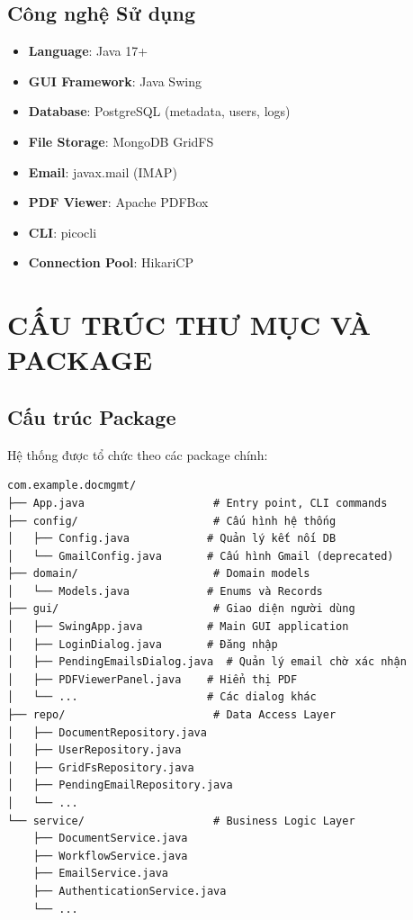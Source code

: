 \documentclass[12pt,a4paper]{article}
\begin{document}
\subsection{Công nghệ Sử dụng}
\begin{itemize}
    \item \textbf{Language}: Java 17+
    \item \textbf{GUI Framework}: Java Swing
    \item \textbf{Database}: PostgreSQL (metadata, users, logs)
    \item \textbf{File Storage}: MongoDB GridFS
    \item \textbf{Email}: javax.mail (IMAP)
    \item \textbf{PDF Viewer}: Apache PDFBox
    \item \textbf{CLI}: picocli
    \item \textbf{Connection Pool}: HikariCP
\end{itemize}

\section{CẤU TRÚC THƯ MỤC VÀ PACKAGE}

\subsection{Cấu trúc Package}
Hệ thống được tổ chức theo các package chính:

\begin{verbatim}
com.example.docmgmt/
├── App.java                    # Entry point, CLI commands
├── config/                     # Cấu hình hệ thống
│   ├── Config.java            # Quản lý kết nối DB
│   └── GmailConfig.java       # Cấu hình Gmail (deprecated)
├── domain/                     # Domain models
│   └── Models.java            # Enums và Records
├── gui/                        # Giao diện người dùng
│   ├── SwingApp.java          # Main GUI application
│   ├── LoginDialog.java       # Đăng nhập
│   ├── PendingEmailsDialog.java  # Quản lý email chờ xác nhận
│   ├── PDFViewerPanel.java    # Hiển thị PDF
│   └── ...                    # Các dialog khác
├── repo/                       # Data Access Layer
│   ├── DocumentRepository.java
│   ├── UserRepository.java
│   ├── GridFsRepository.java
│   ├── PendingEmailRepository.java
│   └── ...
└── service/                    # Business Logic Layer
    ├── DocumentService.java
    ├── WorkflowService.java
    ├── EmailService.java
    ├── AuthenticationService.java
    └── ...
\end{verbatim}
\end{document}
